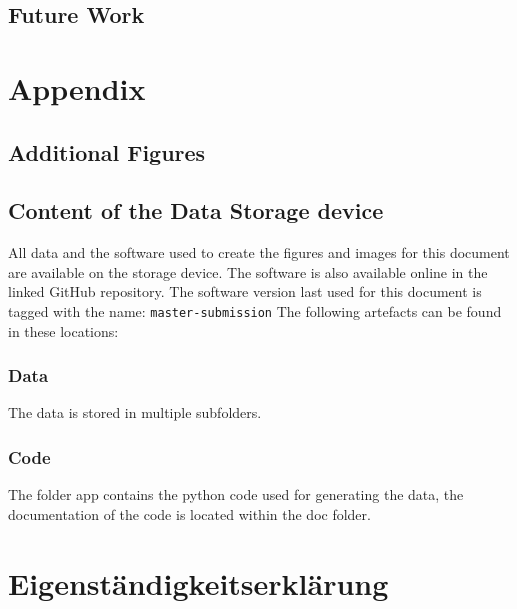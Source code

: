 \documentclass[12pt,a4paper, english]{article}
\begin{document}
% 
\subsection{Future Work}

\newpage
\section{Appendix}
\subsection{Additional Figures}
\subsection{Content of the Data Storage device}
All data and the software used to create the figures and images for this document are available on the storage device.
The software is also available online in the linked GitHub repository.
The software version last used for this document is tagged with the name: \texttt{master-submission}
The following artefacts can be found in these locations:
\subsubsection{Data}
The data is stored in multiple subfolders. 
\subsubsection{Code}
The folder app contains the python code used for generating the data, the documentation of the code is located within the doc folder.
%
%
\newpage
\printbibliography%
\newpage
\section*{Eigenständigkeitserklärung}

\end{document}
